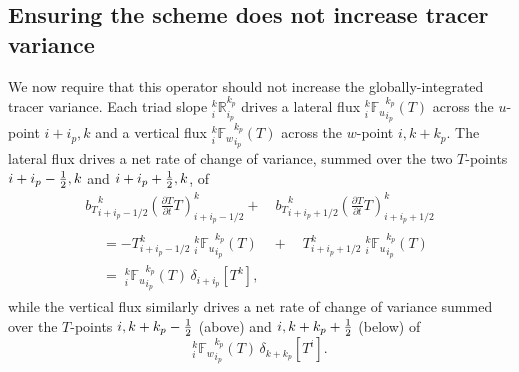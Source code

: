 \subsection{Ensuring the scheme does not increase tracer variance}
\label{sec:triad:variance}

We now require that this operator should not increase the
globally-integrated tracer variance.
Each triad slope $_i^k\mathbb{R}_{i_p}^{k_p}$ drives a lateral flux
$_i^k{\mathbb{F}_u}_{i_p}^{k_p} (T)$ across the $u$-point $i+i_p,k$ and
a vertical flux $_i^k{\mathbb{F}_w}_{i_p}^{k_p} (T)$ across the
$w$-point $i,k+k_p$.  The lateral flux drives a net rate of change of
variance, summed over the two $T$-points $i+i_p-\textstyle\frac{1}{2},k$ and $i+i_p+\textstyle\frac{1}{2},k$, of
\begin{multline}
  {b_T}_{i+i_p-1/2}^k\left(\frac{\partial T}{\partial t}T\right)_{i+i_p-1/2}^k+
  \quad {b_T}_{i+i_p+1/2}^k\left(\frac{\partial T}{\partial
      t}T\right)_{i+i_p+1/2}^k \\
 \begin{split}
  &= -T_{i+i_p-1/2}^k{\;} _i^k{\mathbb{F}_u}_{i_p}^{k_p} (T) \quad + \quad  T_{i+i_p+1/2}^k
  {\;}_i^k{\mathbb{F}_u}_{i_p}^{k_p} (T) \\
  &={\;} _i^k{\mathbb{F}_u}_{i_p}^{k_p} (T)\,\delta_{i+ i_p}[T^k], \label{eq:triad:dvar_iso_i}
 \end{split}
\end{multline}
while the vertical flux similarly drives a net rate of change of
variance summed over the $T$-points $i,k+k_p-\textstyle\frac{1}{2}$ (above) and
$i,k+k_p+\textstyle\frac{1}{2}$ (below) of
\begin{equation}
\label{eq:triad:dvar_iso_k}
  _i^k{\mathbb{F}_w}_{i_p}^{k_p} (T) \,\delta_{k+ k_p}[T^i].
\end{equation}
